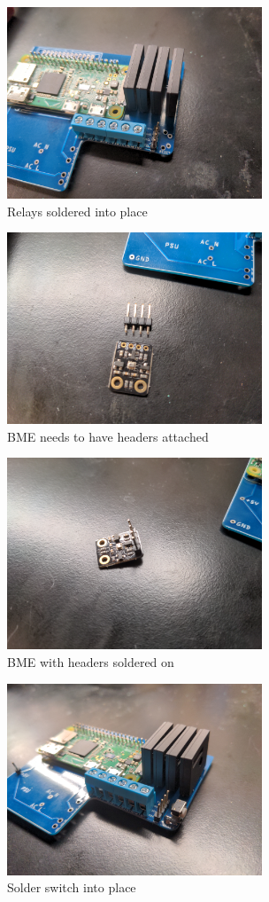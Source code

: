 \begin{figure}
  \centering
  \includegraphics[width=3in]{img/relay_placement.jpg}
  \caption{Relays soldered into place}
  \label{fig:relays}
\end{figure}
\begin{figure}
  \centering
  \includegraphics[width=3in]{img/BME280.jpg}
  \caption{BME needs to have headers attached}
  \label{fig:BME}
\end{figure}
\begin{figure}
  \centering
  \includegraphics[width=3in]{img/BME280_assembled.jpg}
  \caption{BME with headers soldered on}
  \label{fig:BME_soldered}
\end{figure}
\begin{figure}
  \centering
  \includegraphics[width=3in]{img/switch.jpg}
  \caption{Solder switch into place}
  \label{fig:switch}
\end{figure}
